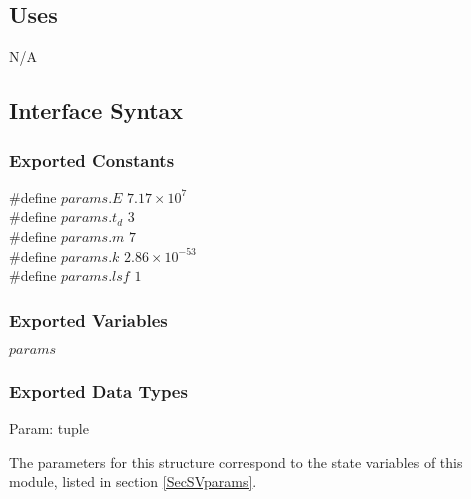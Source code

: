 \documentclass[12pt]{article}
\begin{document}
\subsection{Uses}
N/A



\subsection{Interface Syntax}

\subsubsection{Exported Constants}

\#define $params.E$ $7.17 \times 10^{7}$ \\
\#define $params.t_{d}$ $3$ \\
\#define $params.m$ $7$ \\
\#define $params.k$ $2.86 \times 10^{-53}$ \\
\#define $params.lsf$ $1$

\subsubsection{Exported Variables}

$params$

\subsubsection{Exported Data Types}

Param: tuple
\newline

\noindent The parameters for this structure correspond to 
the state variables of this module, listed in section 
\ref{SecSVparams}.
  
\end{document}
